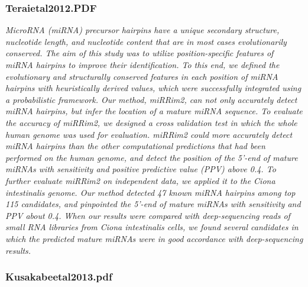 \documentclass[graybox]{svmult}
\begin{document}
\subsubsection{Teraietal2012.PDF}
\cite{Terai2012}
\textit{MicroRNA (miRNA) precursor hairpins have a unique secondary structure, nucleotide length, and nucleotide content that are in most cases evolutionarily conserved. The aim of this study was to utilize position-specific features of miRNA hairpins to improve their identification. To this end, we defined the evolutionary and structurally conserved features in each position of miRNA hairpins with heuristically derived values, which were successfully integrated using a probabilistic framework. Our method, miRRim2, can not only accurately detect miRNA hairpins, but infer the location of a mature miRNA sequence. To evaluate the accuracy of miRRim2, we designed a cross validation test in which the whole human genome was used for evaluation. miRRim2 could more accurately detect miRNA hairpins than the other computational predictions that had been performed on the human genome, and detect the position of the 5'-end of mature miRNAs with sensitivity and positive predictive value (PPV) above 0.4. To further evaluate miRRim2 on independent data, we applied it to the Ciona intestinalis genome. Our method detected 47 known miRNA hairpins among top 115 candidates, and pinpointed the 5'-end of mature miRNAs with sensitivity and PPV about 0.4. When our results were compared with deep-sequencing reads of small RNA libraries from Ciona intestinalis cells, we found several candidates in which the predicted mature miRNAs were in good accordance with deep-sequencing results.}


\subsubsection{Kusakabeetal2013.pdf}
\end{document}
